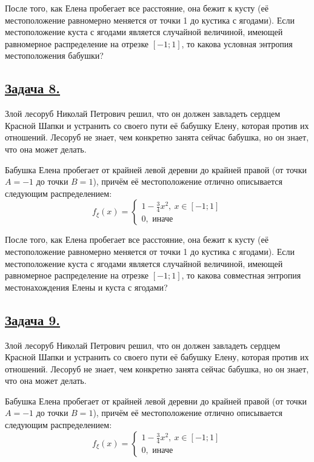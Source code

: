 После того, как Елена пробегает все расстояние, она бежит к кусту (её местоположение равномерно меняется от точки 1 до кустика с ягодами). Если местоположение куста с ягодами является случайной величиной, имеющей равномерное распределение на отрезке $[-1; 1]$, то какова условная энтропия местоположения бабушки?

\subsection*{\hyperref[sec:sol_problem8]{Задача 8.}}\label{sec:problem8} Злой лесоруб Николай Петрович решил, что он должен завладеть сердцем Красной Шапки и устранить со своего пути её бабушку Елену, которая против их отношений. Лесоруб не знает, чем конкретно занята сейчас бабушка, но он знает, что она может делать.

Бабушка Елена пробегает от крайней левой деревни до крайней правой (от точки $A=-1$ до точки $B=1$), причём её местоположение отлично описывается следующим распределением:\[f_{\xi}(x)=\begin{cases}
    1-\frac{3}{4}x^2, \ x\in [-1; 1] \\
    0, \text{ иначе}
\end{cases} \]

После того, как Елена пробегает все расстояние, она бежит к кусту (её местоположение равномерно меняется от точки 1 до кустика с ягодами). Если местоположение куста с ягодами является случайной величиной, имеющей равномерное распределение на отрезке $[-1; 1]$, то какова совместная энтропия местонахождения Елены и куста с ягодами?

\subsection*{\hyperref[sec:sol_problem9]{Задача 9.}}\label{sec:problem9} Злой лесоруб Николай Петрович решил, что он должен завладеть сердцем Красной Шапки и устранить со своего пути её бабушку Елену, которая против их отношений. Лесоруб не знает, чем конкретно занята сейчас бабушка, но он знает, что она может делать.

Бабушка Елена пробегает от крайней левой деревни до крайней правой (от точки $A=-1$ до точки $B=1$), причём её местоположение отлично описывается следующим распределением:\[f_{\xi}(x)=\begin{cases}
    1-\frac{3}{4}x^2, \ x\in [-1; 1] \\
    0, \text{ иначе}
\end{cases} \]

